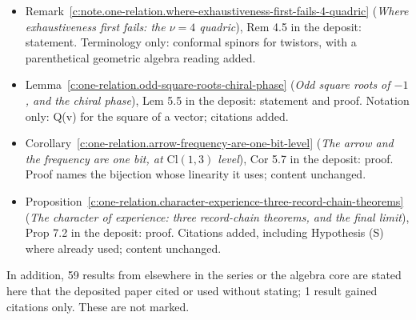 \documentclass[11pt]{article}
\theoremstyle{definition}
\theoremstyle{plain}
\providecommand{\Cl}{}\renewcommand{\Cl}{\mathrm{Cl}}
\begin{document}
\begin{itemize}
\item Remark~\ref{c:note.one-relation.where-exhaustiveness-first-fails-4-quadric} (\emph{Where exhaustiveness first fails: the $\nu = 4$ quadric}), Rem 4.5 in the deposit: statement. Terminology only: conformal spinors for twistors, with a parenthetical geometric algebra reading added.
\item Lemma~\ref{c:one-relation.odd-square-roots-chiral-phase} (\emph{Odd square roots of $-1$, and the chiral phase}), Lem 5.5 in the deposit: statement and proof. Notation only: Q(v) for the square of a vector; citations added.
\item Corollary~\ref{c:one-relation.arrow-frequency-are-one-bit-level} (\emph{The arrow and the frequency are one bit, at $\Cl(1,3)$ level}), Cor 5.7 in the deposit: proof. Proof names the bijection whose linearity it uses; content unchanged.
\item Proposition~\ref{c:one-relation.character-experience-three-record-chain-theorems} (\emph{The character of experience: three record-chain theorems, and the final limit}), Prop 7.2 in the deposit: proof. Citations added, including Hypothesis (S) where already used; content unchanged.
\end{itemize}
\noindent In addition, 59 results from elsewhere in the series or the algebra core are stated here that the deposited paper cited or used without stating; 1 result gained citations only. These are not marked.
\end{document}
